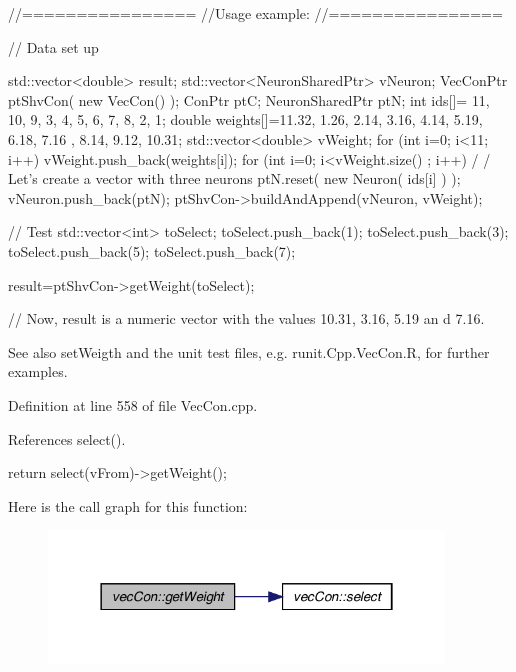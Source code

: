 \begin{DoxyCode}
        //================
        //Usage example:
        //================

        // Data set up

                std::vector<double> result;
                std::vector<NeuronSharedPtr> vNeuron;
                VecConPtr ptShvCon( new VecCon() );
                ConPtr    ptC;
                NeuronSharedPtr ptN;
                int ids[]= {11, 10, 9, 3, 4, 5, 6, 7, 8, 2, 1};
                double weights[]={11.32, 1.26, 2.14, 3.16, 4.14, 5.19, 6.18, 7.16
      , 8.14, 9.12, 10.31};
                std::vector<double> vWeight;
                for (int i=0; i<11; i++) {
                        vWeight.push_back(weights[i]);
                }
                for (int i=0; i<vWeight.size() ; i++) {                         /
      / Let's create a vector with three neurons
                        ptN.reset( new Neuron( ids[i] ) );
                        vNeuron.push_back(ptN);
                }
                ptShvCon->buildAndAppend(vNeuron, vWeight);

        // Test
                std::vector<int> toSelect;
                toSelect.push_back(1);
                toSelect.push_back(3);
                toSelect.push_back(5);
                toSelect.push_back(7);

                result=ptShvCon->getWeight(toSelect);

        // Now, result is a numeric vector with the values  10.31, 3.16,  5.19 an
      d 7.16.
\end{DoxyCode}


\begin{DoxySeeAlso}{See also}
setWeigth and the unit test files, e.g. runit.Cpp.VecCon.R, for further examples. 
\end{DoxySeeAlso}


Definition at line 558 of file VecCon.cpp.



References select().


\begin{DoxyCode}
                                                                        {
        return  select(vFrom)->getWeight();
}
\end{DoxyCode}


Here is the call graph for this function:\nopagebreak
\begin{figure}[H]
\begin{center}
\leavevmode
\includegraphics[width=298pt]{classvec_con_ac3d4b7b11bfff3407afd585c1ae6a658_cgraph}
\end{center}
\end{figure}


